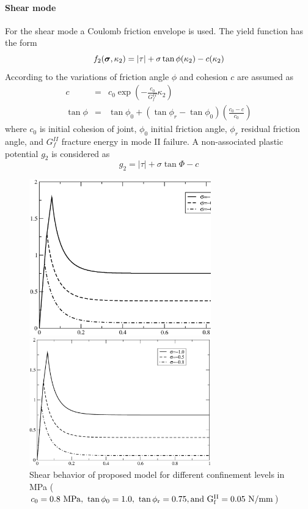 \documentclass[a4paper]{article}
\newcommand{\mbf}[1]{\mbox{\boldmath$#1$}}
\newcommand{\del}[2]{\mbox{$\displaystyle\frac{#1}{#2}$}}
\newcommand{\sig}{\mbf{\sigma}}
\begin{document}
\paragraph{Shear mode}
For the shear mode a Coulomb friction envelope is used. The yield function has the form
\begin{equation}
  f_2(\sig,\kappa_2) = \vert\tau\vert+\sigma\tan\phi(\kappa_2)-c(\kappa_2)
\end{equation}
According to \cite{Rots} the variations of friction angle $\phi$ and cohesion $c$ are assumed as
\begin{eqnarray}
  \label{c}
  c&=&c_0\exp\left(-\del{c_0}{G^{II}_f}\kappa_2\right)\\
  \tan\phi&=&\tan\phi_0+(\tan\phi_r-\tan\phi_0)\left(\del{c_0-c}{c_0}\right)
\end{eqnarray}
where $c_0$ is initial cohesion of joint, $\phi_0$ initial friction angle, $\phi_r$ residual friction angle, and $G^{II}_f$ fracture energy in mode II failure. A non-associated plastic potential $g_2$ is considered as
\begin{equation}
  g_2=\vert\tau\vert+\sigma\tan\Phi-c
\end{equation}
\begin{figure}[!htb]
\begin{htmlonly}
  \centerline{\includegraphics[width=0.7\textwidth]{shearconf.eps}}
\end{htmlonly}
 \centerline{\includegraphics[width=0.7\textwidth]{shearconf}}
  \caption{Shear behavior of proposed model for different confinement levels in MPa ($c_0=0.8\ \rm{MPa},\ \tan\phi_0=1.0,\ \tan\phi_r=0.75,{\rm and}\ G_f^{II}=0.05\ {N/mm}$)}
\end{figure}
\end{document}
